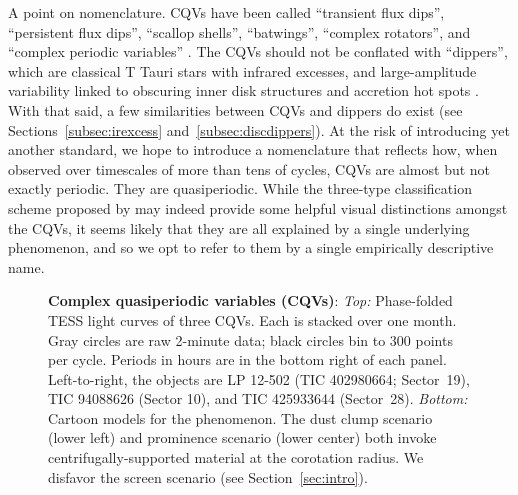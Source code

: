\documentclass[11pt,twocolumn,tighten]{aastex63}
\begin{document}
A point on nomenclature.  CQVs have been called ``transient flux
dips'', ``persistent flux dips'', ``scallop shells'', ``batwings'',
\citep{2017AJ....153..152S} ``complex rotators'',
\citep{2019ApJ...876..127Z,2022AJ....163..144G,2023ApJ...945..114P}
and ``complex periodic variables'' \citep{2023MNRAS.518.2921K}.  The
CQVs should not be conflated with ``dippers'', which are classical T
Tauri stars with infrared excesses, and large-amplitude variability
linked to obscuring inner disk structures and accretion hot spots
\citep{2014AJ....147...82C,2021ApJ...908...16R}.  With that said, a
few similarities between CQVs and dippers do exist (see
Sections~\ref{subsec:irexcess} and~\ref{subsec:discdippers}).  At the
risk of introducing yet another standard, we hope to introduce a
nomenclature that reflects how, when observed over timescales of more
than tens of cycles, CQVs are almost but not exactly periodic.  They
are quasiperiodic.  While the three-type classification scheme
proposed by \citet{2017AJ....153..152S} may indeed provide some
helpful visual distinctions amongst the CQVs, it seems likely that
they are all explained by a single underlying phenomenon, and so we
opt to refer to them by a single empirically descriptive name.


\begin{figure*}[!t]
	\begin{center}
		
		\vspace{-0.6cm}
	\end{center}
		\vspace{-0.3cm}
	\caption{
		{\bf Complex quasiperiodic variables (CQVs)}:
    {\it Top:} Phase-folded TESS light curves of three CQVs.  Each is
    stacked over one month.  Gray circles are raw 2-minute data; black
    circles bin to 300 points per cycle.  Periods in hours are in the
    bottom right of each panel.  Left-to-right, the objects are LP
    12-502 (TIC 402980664; Sector~19), TIC 94088626 (Sector 10), and
    TIC 425933644 (Sector~28).
    {\it Bottom:} Cartoon models for the phenomenon.  The dust clump
    scenario (lower left) and prominence scenario (lower center) both
    invoke centrifugally-supported material at the corotation radius.
    We disfavor the screen scenario (see Section~\ref{sec:intro}).
	}
	\label{fig:f1}
\end{figure*}
\end{document}
